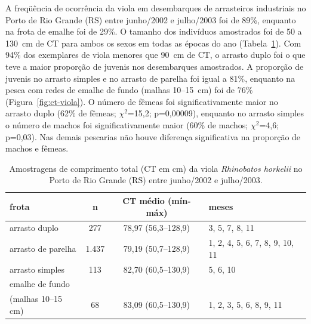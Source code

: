 \documentclass[a4paper,11pt,twoside,showtrims,onecolumn,openright,final]{memoir}
\begin{document}

A freqüência de ocorrência da viola em desembarques de arrasteiros industriais no Porto de 
Rio Grande (RS) entre junho/2002 e julho/2003 foi de 89\%, enquanto na frota de emalhe foi 
de 29\%.  O tamanho dos indivíduos amostrados foi de 50 a 130~cm de CT para ambos os sexos 
em todas as épocas do ano (Tabela~\ref{tab:ct-viola}). Com 94\% dos exemplares de viola menores que 90~cm 
de CT, o arrasto duplo foi o que teve a maior proporção de juvenis nos desembarques 
amostrados. A proporção de juvenis no arrasto simples e no arrasto de parelha foi igual 
a 81\%, enquanto na pesca com redes de emalhe de fundo (malhas 10--15~cm) foi de 76\% (Figura~\ref{fig:ct-viola}). 
O número de fêmeas foi significativamente maior no arrasto duplo 
(62\% de fêmeas; $\chi^2$=15,2; p=0,00009), enquanto no arrasto simples o número de machos foi significativamente maior (60\% de machos; $\chi^2$=4,6; p=0,03). 
Nas demais pescarias não houve diferença significativa na proporção de machos e fêmeas.


\begin{table}
\caption[Amostragens de comprimento total da viola \emph{Rhinobatos horkelii}]
        {Amostragens de comprimento total (CT em cm) da viola \emph{Rhinobatos horkelii} no 
         Porto de Rio Grande (RS) entre junho/2002 e julho/2003.}
\label{tab:ct-viola}
\begin{center}
\begin{tabular*}{\textwidth}{l@{\extracolsep{\fill}}ccl}
\toprule
frota			& n		& CT médio (mín-máx)		& meses					\\
\midrule
arrasto duplo		& 277		& 78,97 (56,3--128,9)		& 3, 5, 7, 8, 11			\\
arrasto de parelha	& 1.437		& 79,19 (50,7--128,9)		& 1, 2, 4, 5, 6, 7, 8, 9, 10, 11	\\
arrasto simples		& 113		& 82,70 (60,5--130,9)		& 5, 6, 10				\\
emalhe de fundo		&		&				&					\\
(malhas 10--15 cm)	& 68		& 83,09 (60,5--130,9)		& 1, 2, 3, 5, 6, 8, 9, 11		\\
\bottomrule
\end{tabular*}
\end{center}
\end{table}

%
%
\end{document}
